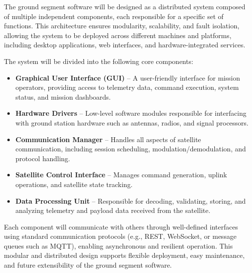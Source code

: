 The ground segment software will be designed as a distributed system composed of multiple independent components, each responsible for a specific set of functions. This architecture ensures modularity, scalability, and fault isolation, allowing the system to be deployed across different machines and platforms, including desktop applications, web interfaces, and hardware-integrated services.

The system will be divided into the following core components:

\begin{itemize}
    \item \textbf{Graphical User Interface (GUI)} – A user-friendly interface for mission operators, providing access to telemetry data, command execution, system status, and mission dashboards.
    \item \textbf{Hardware Drivers} – Low-level software modules responsible for interfacing with ground station hardware such as antennas, radios, and signal processors.
    \item \textbf{Communication Manager} – Handles all aspects of satellite communication, including session scheduling, modulation/demodulation, and protocol handling.
    \item \textbf{Satellite Control Interface} – Manages command generation, uplink operations, and satellite state tracking.
    \item \textbf{Data Processing Unit} – Responsible for decoding, validating, storing, and analyzing telemetry and payload data received from the satellite.
\end{itemize}

Each component will communicate with others through well-defined interfaces using standard communication protocols (e.g., REST, WebSocket, or message queues such as MQTT), enabling asynchronous and resilient operation. This modular and distributed design supports flexible deployment, easy maintenance, and future extensibility of the ground segment software.





